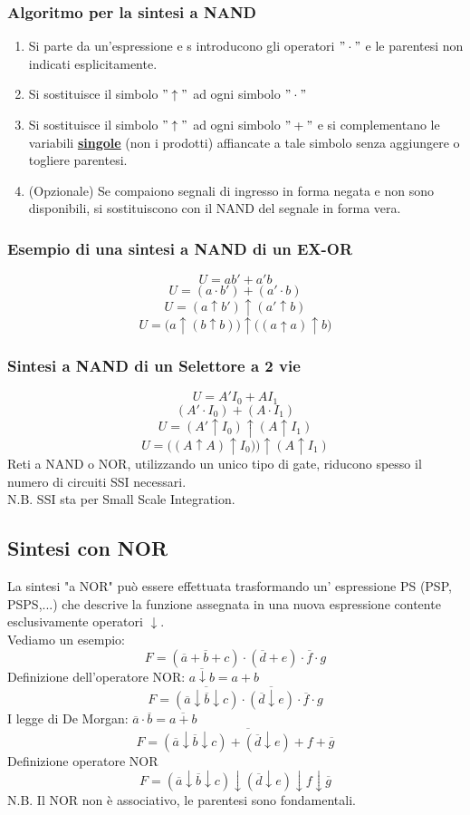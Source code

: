 \documentclass{article}
\begin{document}
\subsubsection{Algoritmo per la sintesi a NAND}
\begin{enumerate}
    \item Si parte da un'espressione e s introducono gli operatori $"\cdot"$ e le parentesi non indicati esplicitamente.
    \item Si sostituisce il simbolo $"\uparrow"$ ad ogni simbolo $"\cdot"$
    \item Si sostituisce il simbolo $"\uparrow"$ ad ogni simbolo $"+"$ e si complementano le variabili \textbf{\underline{singole}} (non i prodotti) affiancate a tale simbolo senza aggiungere o togliere parentesi.
    \item (Opzionale) Se compaiono segnali di ingresso in forma negata e non sono disponibili, si sostituiscono con il NAND del segnale in forma vera.
\end{enumerate}
\subsubsection*{Esempio di una sintesi a NAND di un EX-OR}
$$ U = a b' + a'b $$
$$ U = (a \cdot b') + (a' \cdot b) $$
$$ U = (a \uparrow b') \uparrow(a' \uparrow b) $$
$$ U = \big( a \uparrow (b \uparrow b) \big) \uparrow \big( (a \uparrow a) \uparrow b \big) $$
\subsubsection*{Sintesi a NAND di un Selettore a 2 vie}
$$ U = A'I_0 + A I_1 $$
$$ (A' \cdot I_0) + (A \cdot I_1) $$
$$ U = (A' \uparrow I_0) \uparrow (A \uparrow I_1) $$
$$ U = \big( (A \uparrow A) \uparrow I_0 ) \big) \uparrow (A \uparrow I_1) $$
Reti a NAND o NOR, utilizzando un unico tipo di gate, riducono spesso il numero di circuiti SSI necessari. \\
N.B. SSI sta per Small Scale Integration.
\subsection{Sintesi con NOR}
La sintesi "a NOR" può essere effettuata trasformando un' espressione PS (PSP, PSPS,...) che descrive la funzione assegnata in una nuova espressione contente esclusivamente operatori $\downarrow$.
\vspace{0.1cm}\\
Vediamo un esempio:
$$ F = (\overline{a} + \overline{b}+c) \cdot (\overline{d} +e) \cdot \overline{f} \cdot g $$
Definizione dell'operatore NOR: $\overline{a \downarrow b} = a +b $
$$ F = \overline{(\overline{a }\downarrow \overline{b} \downarrow c) }\cdot \overline{(\overline{d} \downarrow e) }\cdot \overline{f} \cdot g$$
I legge di De Morgan: $\overline{a} \cdot \overline{b} = \overline{a+b} $
$$ F = \overline{(\overline{a }\downarrow \overline{b} \downarrow c) + (\overline{d} \downarrow e) + f + \overline{g}} $$
Definizione operatore NOR
$$ F = (\overline{a }\downarrow \overline{b} \downarrow c) \downarrow (\overline{d} \downarrow e) \downarrow f \downarrow \overline{g} $$
N.B. Il NOR non è associativo, le parentesi sono fondamentali.
\end{document}
